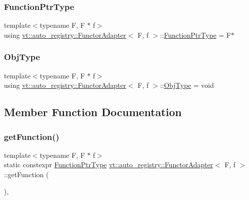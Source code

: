 \subsubsection{\texorpdfstring{Function\+Ptr\+Type}{FunctionPtrType}}
{\footnotesize\ttfamily template$<$typename F, F $\ast$ f$>$ \\
using \hyperlink{structvt_1_1auto__registry_1_1_functor_adapter}{vt\+::auto\+\_\+registry\+::\+Functor\+Adapter}$<$ F, f $>$\+::\hyperlink{structvt_1_1auto__registry_1_1_functor_adapter_a0bd9bd956e985ea53ad574d96bbcdfa1}{Function\+Ptr\+Type} =  F$\ast$}

\mbox{\label{structvt_1_1auto__registry_1_1_functor_adapter_acfe32996589057d89a50c88bc78529ec}} 
\subsubsection{\texorpdfstring{Obj\+Type}{ObjType}}
{\footnotesize\ttfamily template$<$typename F, F $\ast$ f$>$ \\
using \hyperlink{structvt_1_1auto__registry_1_1_functor_adapter}{vt\+::auto\+\_\+registry\+::\+Functor\+Adapter}$<$ F, f $>$\+::\hyperlink{structvt_1_1auto__registry_1_1_functor_adapter_acfe32996589057d89a50c88bc78529ec}{Obj\+Type} =  void}



\subsection{Member Function Documentation}
\mbox{\label{structvt_1_1auto__registry_1_1_functor_adapter_af7868cfd0a03bdc74030f75246e3f702}} 
\subsubsection{\texorpdfstring{get\+Function()}{getFunction()}}
{\footnotesize\ttfamily template$<$typename F, F $\ast$ f$>$ \\
static constexpr \hyperlink{structvt_1_1auto__registry_1_1_functor_adapter_a0bd9bd956e985ea53ad574d96bbcdfa1}{Function\+Ptr\+Type} \hyperlink{structvt_1_1auto__registry_1_1_functor_adapter}{vt\+::auto\+\_\+registry\+::\+Functor\+Adapter}$<$ F, f $>$\+::get\+Function (\begin{DoxyParamCaption}{ }\end{DoxyParamCaption})\hspace{0.3cm}{\ttfamily [inline]}, {\ttfamily [static]}}

